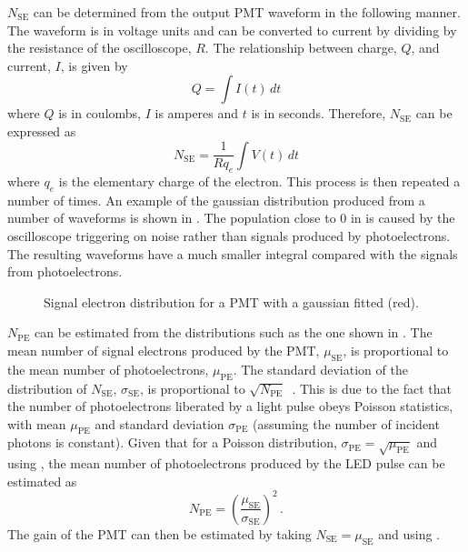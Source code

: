 $N_{\text{SE}}$ can be determined from the output PMT waveform in the following manner.
The waveform is in voltage units and can be converted to current by dividing by the resistance of the oscilloscope, $R$.
The relationship between charge, $Q$, and current, $I$, is given by
\begin{equation}
  Q = \int I(t) \, dt
\end{equation}
where $Q$ is in coulombs, $I$ is amperes and $t$ is in seconds.
Therefore, $N_{\text{SE}}$ can be expressed as
\begin{equation}
  N_{\text{SE}} = \frac{1}{R q_{e}} \int V(t) \, dt
\end{equation}
where $q_{e}$ is the elementary charge of the electron.
This process is then repeated a number of times.
An example of the gaussian distribution produced from a number of waveforms is shown in .
The population close to 0 in  is caused by the oscilloscope triggering on noise rather than signals produced by photoelectrons.
The resulting waveforms have a much smaller integral compared with the signals from photoelectrons.

\begin{figure}[h]
  \begin{adjustbox}{max totalsize={.8\textwidth}, center}
    
  \end{adjustbox}
  \caption[Signal electron multiplicity distribution for a PMT.]{Signal electron distribution for a PMT with a gaussian fitted (red).}
  \label{fig:N_se}
\end{figure}

$N_{\text{PE}}$ can be estimated from the distributions such as the one shown in .
The mean number of signal electrons produced by the PMT, $\mu_{\text{SE}}$, is proportional to the mean number of photoelectrons, $\mu_{\text{PE}}$.
The standard deviation of the distribution of $N_{\text{SE}}$, $\sigma_{\text{SE}}$, is proportional to $\sqrt{N_{\text{PE}}}$~\cite{photoelectrons}.
This is due to the fact that the number of photoelectrons liberated by a light pulse obeys Poisson statistics, with mean $\mu_{\text{PE}}$ and standard deviation $\sigma_{\text{PE}}$ (assuming the number of incident photons is constant).
Given that for a Poisson distribution, $\sigma_{\text{PE}} = \sqrt{\mu_{\text{PE}}}$ and using , the mean number of photoelectrons produced by the LED pulse can be estimated as
\begin{equation}
  N_{\text{PE}} = \left( \frac{ \mu_{\text{SE}} }{ \sigma_{\text{SE}} }  \right)^{2} \, .
\end{equation}
The gain of the PMT can then be estimated by taking $N_{\text{SE}} = \mu_{\text{SE}}$ and using .

